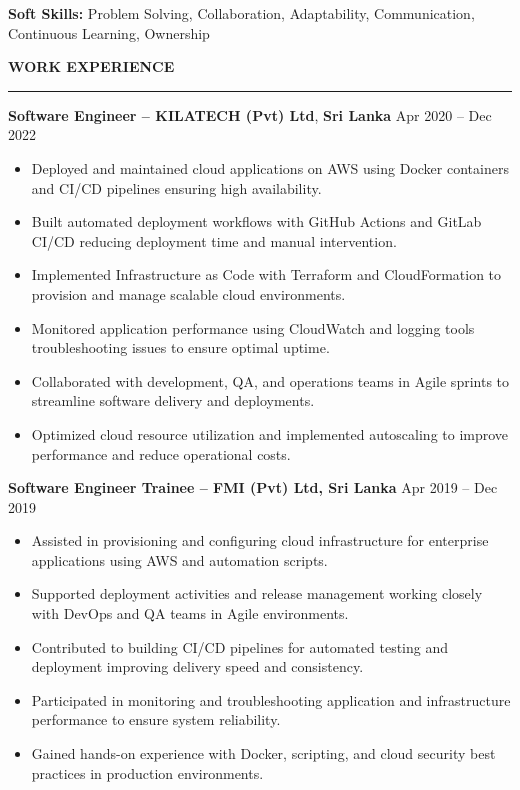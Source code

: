 \documentclass[10pt,letterpaper]{article}
\begin{document}
\textbf{Soft Skills:} Problem Solving, Collaboration, Adaptability, Communication, Continuous Learning, Ownership

\vspace{8pt}

\textbf{WORK EXPERIENCE}\\[-8pt]
\noindent\rule{\textwidth}{1pt}

\vspace{-2pt}

\textbf{Software Engineer -- KILATECH (Pvt) Ltd}, \textbf{Sri Lanka} \hfill Apr 2020 -- Dec 2022

\vspace{-1pt}

\begin{itemize}
\item Deployed and maintained cloud applications on AWS using Docker containers and CI/CD pipelines ensuring high availability.
\item Built automated deployment workflows with GitHub Actions and GitLab CI/CD reducing deployment time and manual intervention.
\item Implemented Infrastructure as Code with Terraform and CloudFormation to provision and manage scalable cloud environments.
\item Monitored application performance using CloudWatch and logging tools troubleshooting issues to ensure optimal uptime.
\item Collaborated with development, QA, and operations teams in Agile sprints to streamline software delivery and deployments.
\item Optimized cloud resource utilization and implemented autoscaling to improve performance and reduce operational costs.
\end{itemize}

\textbf{Software Engineer Trainee -- FMI (Pvt) Ltd, Sri Lanka} \hfill Apr 2019 -- Dec 2019

\vspace{-1pt}

\begin{itemize}
\item Assisted in provisioning and configuring cloud infrastructure for enterprise applications using AWS and automation scripts.
\item Supported deployment activities and release management working closely with DevOps and QA teams in Agile environments.
\item Contributed to building CI/CD pipelines for automated testing and deployment improving delivery speed and consistency.
\item Participated in monitoring and troubleshooting application and infrastructure performance to ensure system reliability.
\item Gained hands-on experience with Docker, scripting, and cloud security best practices in production environments.
\end{itemize}
\end{document}
